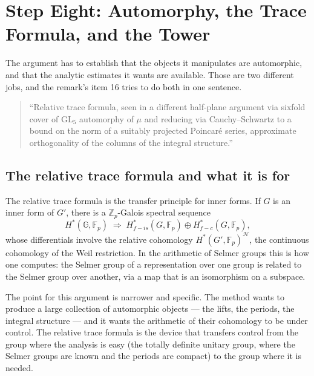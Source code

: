 
\chapter{Step Eight: Automorphy, the Trace Formula, and the Tower}
\label{ch:automorphy}

The argument has to establish that the objects it manipulates are automorphic,
and that the analytic estimates it wants are available. Those are two different
jobs, and the remark's item 16 tries to do both in one sentence.

\begin{quote}
\small
``Relative trace formula, seen in a different half-plane argument via sixfold
cover of $\mathrm{GL}_5$ automorphy of $\mu$ and reducing via
Cauchy--Schwartz to a bound on the norm of a suitably projected Poincar\'e
series, approximate orthogonality of the columns of the integral structure.''
\end{quote}

\section{The relative trace formula and what it is for}The relative trace formula is the transfer principle for inner forms. If
$G$ is an inner form of $G'$, there is a $\mathbb{Z}_p$-Galois spectral
sequence
\begin{equation}
H^*(\mathbb{G}, \mathbb{F}_p) \;\Longrightarrow\;
H^*_{f-is}(G, \mathbb{F}_p) \oplus H^*_{f-c}(G, \mathbb{F}_p),
\end{equation}
whose differentials involve the relative cohomology $H^*(G', \mathbb{F}_p)^{
\mathcal{H}}$, the continuous cohomology of the Weil restriction. In the
arithmetic of Selmer groups this is how one computes: the Selmer group of a
representation over one group is related to the Selmer group over another, via
a map that is an isomorphism on a subspace.

The point for this argument is narrower and specific. The method wants to
produce a large collection of automorphic objects --- the lifts, the periods,
the integral structure --- and it wants the arithmetic of their cohomology to
be under control. The relative trace formula is the device that transfers
control from the group where the analysis is easy (the totally definite
unitary group, where the Selmer groups are known and the periods are
compact) to the group where it is needed.

